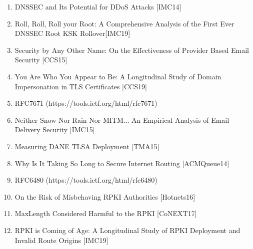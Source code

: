 \documentclass[11pt]{article}
\newcommand{\heading}[2]{{\bigskip\pdfbookmark{#1}{#1}\noindent\textcolor{BrickRed}{\Large\textsc{\lowercase{#1}}
{\footnotesize{#2}}}}\medskip\\}
\begin{document}
\begin{enumerate}
\item{DNSSEC and Its Potential for DDoS Attacks [IMC14]}
\item{Roll, Roll, Roll your Root: A Comprehensive Analysis of the First Ever DNSSEC Root KSK Rollover[IMC19]}
\item{Security by Any Other Name: On the Effectiveness of Provider Based Email Security [CCS15]}
\item{You Are Who You Appear to Be: A Longitudinal Study of Domain Impersonation in TLS Certificates [CCS19]}
\item{RFC7671 (https://tools.ietf.org/html/rfc7671)}
\item{Neither Snow Nor Rain Nor MITM... An Empirical Analysis of Email Delivery Security [IMC15]}
\item{Measuring DANE TLSA Deployment [TMA15]}
\item{Why Is It Taking So Long to Secure Internet Routing [ACMQueue14]}
\item{RFC6480 (https://tools.ietf.org/html/rfc6480)}
\item{On the Risk of Misbehaving RPKI Authorities [Hotnets16]}
\item{MaxLength Considered Harmful to the RPKI  [CoNEXT17]}
\item{RPKI is Coming of Age: A Longitudinal Study of RPKI Deployment and Invalid Route Origins
 [IMC19]}
\end{enumerate}





\end{document}
